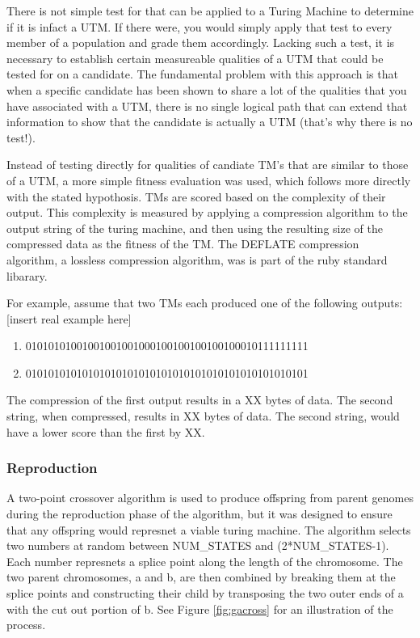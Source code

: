 There is not simple test for that can be applied to a Turing Machine to determine if it is infact a UTM. If there were, you would simply apply that test to every member of a population and grade them accordingly. Lacking such a test, it is necessary to establish certain measureable qualities of a UTM that could be tested for on a candidate. The fundamental problem with this approach is that when a specific candidate has been shown to share a lot of the qualities that you have associated with a UTM, there is no single logical path that can extend that information to show that the candidate is actually a UTM (that's why there is no test!). 

Instead of testing directly for qualities of candiate TM's that are similar to those of a UTM, a more simple fitness evaluation was used, which follows more directly with the stated hypothosis. TMs are scored based on the complexity of their output. This complexity is measured by applying a compression algorithm to the output string of the turing machine, and then using the resulting size of the compressed data as the fitness of the TM. The DEFLATE compression algorithm, a lossless compression algorithm,  was is part of the ruby standard libarary. 

For example, assume that two TMs each produced one of the following outputs: [insert real example here]
\begin{enumerate}
	\item 01010101001001001001000100100100100100010111111111
	\item 01010101010101010101010101010101010101010101010101
\end{enumerate}
The compression of the first output results in a XX bytes of data. The second string, when compressed, results in XX bytes of data. The second string, would have a lower score than the first by XX. 

\subsubsection{Reproduction}
A two-point crossover algorithm is used to produce offspring from parent genomes during the reproduction phase of the algorithm, but it was designed to ensure that any offspring would represnet a viable turing machine. The algorithm selects two numbers at random between NUM_STATES and (2*NUM_STATES-1). Each number represnets a splice point along the length of the chromosome. The two parent chromosomes, a and b, are then combined by breaking them at the splice points and constructing their child by transposing the two outer ends of a with the cut out portion of b. See Figure \ref{fig:gacross} for an illustration of the process. 